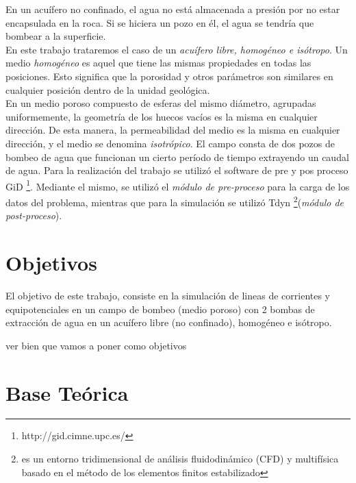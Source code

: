 \documentclass[10pt,a4paper,final]{article}
\begin{document}
En un acuífero no confinado, el agua no está almacenada a presión por no estar encapsulada en la roca. Si se hiciera un pozo en él, el agua se tendría que bombear a la superficie.\\
En este trabajo trataremos el caso de un \emph{acuífero libre, homogéneo e isótropo}. 
Un medio \emph{homogéneo} es aquel que tiene las mismas propiedades en todas las posiciones. Esto significa que la porosidad y otros parámetros son similares en cualquier posición dentro de la unidad geológica.\\
En un medio poroso compuesto de esferas del mismo diámetro, agrupadas uniformemente, la geometría de los huecos vacíos es la misma en cualquier dirección. De esta manera, la permeabilidad del medio es la misma en cualquier dirección, y el medio se denomina \emph{isotrópico}.
El campo consta de dos pozos de bombeo de agua que funcionan un cierto período de tiempo extrayendo un caudal de agua.
Para la realización del trabajo se utilizó el software de pre y pos proceso GiD \footnote{http://gid.cimne.upc.es/}. Mediante el mismo, se utilizó el \emph{módulo de pre-proceso} para la carga de los datos del problema, mientras que para la simulación se utilizó Tdyn \footnote{es un entorno tridimensional de análisis fluidodinámico (CFD) y multifísica basado en el método de los elementos finitos estabilizado}(\emph{módulo de post-proceso}).
\section{Objetivos}
El objetivo de este trabajo, consiste en la simulación de lineas de corrientes y equipotenciales en un campo de bombeo (medio poroso) con 2 bombas de extracción de agua en un acuífero libre (no confinado), homogéneo e isótropo. \begin{LARGE}
ver bien que vamos a poner como objetivos
\end{LARGE}

\section{Base Teórica}
\end{document}

